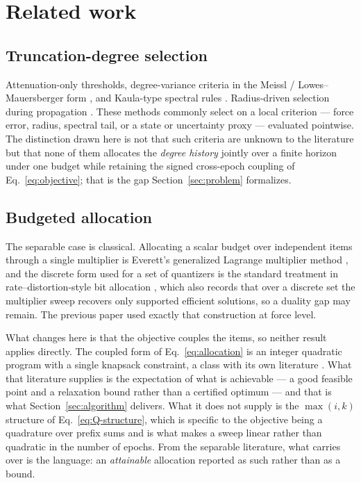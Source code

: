 \section{Related work}
\label{sec:related}

\subsection{Truncation-degree selection}

 Attenuation-only thresholds, degree-variance criteria in the
Meissl / Lowes--Mauersberger form \citep{RummelVanGelderen1995,Lowes1966}, and
Kaula-type spectral rules \citep{kaula1966theory}. Radius-driven selection
during propagation \citep{atallah2022radial}. These methods commonly select on
a local criterion --- force error, radius, spectral tail, or a state or
uncertainty proxy --- evaluated pointwise. The distinction drawn here is not
that such criteria are unknown to the literature but that none of them
allocates the \emph{degree history} jointly over a finite horizon under one
budget while retaining the signed cross-epoch coupling of
Eq.~\eqref{eq:objective}; that is the gap Section~\ref{sec:problem}
formalizes.

\subsection{Budgeted allocation}
\label{sec:related-allocation}

The separable case is classical. Allocating a scalar budget over independent
items through a single multiplier is Everett's generalized Lagrange multiplier
method \citep{everett1963generalized}, and the discrete form used for a set of
quantizers is the standard treatment in rate--distortion-style bit allocation
\citep{shoham1988efficient}, which also records that over a discrete set the
multiplier sweep recovers only supported efficient solutions, so a duality gap
may remain. The previous paper used exactly that construction at force level.

What changes here is that the objective couples the items, so neither result
applies directly. The coupled form of Eq.~\eqref{eq:allocation} is an integer
quadratic program with a single knapsack constraint, a class with its own
literature . What that literature
supplies is the expectation of what is achievable --- a good feasible point and
a relaxation bound rather than a certified optimum --- and that is what
Section~\ref{sec:algorithm} delivers. What it does not supply is the
$\max(i,k)$ structure of Eq.~\eqref{eq:Q-structure}, which is specific to the
objective being a quadrature over prefix sums and is what makes a sweep linear
rather than quadratic in the number of epochs. From the separable literature,
what carries over is the language: an \emph{attainable} allocation reported as
such rather than as a bound.

